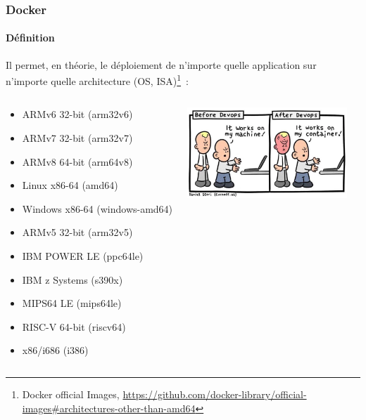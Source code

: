 \documentclass{beamer}
\begin{document}
    \begin{frame}
        \transdissolve
        \frametitle{Docker}
        \framesubtitle{Définition}
        Il permet, en théorie, le déploiement de n'importe quelle application sur n'importe quelle architecture (OS, ISA)\footnote{Docker official Images, \url{https://github.com/docker-library/official-images\#architectures-other-than-amd64}}~:
        \bigbreak
        \begin{columns}
            \begin{scriptsize}
                \begin{itemize}
                    \item ARMv6 32-bit (arm32v6)
                    \item ARMv7 32-bit (arm32v7)
                    \item ARMv8 64-bit (arm64v8)
                    \item Linux x86-64 (amd64)
                    \item Windows x86-64 (windows-amd64)
                    \item ARMv5 32-bit (arm32v5)
                    \item IBM POWER LE (ppc64le)
                    \item IBM z Systems (s390x)
                    \item MIPS64 LE (mips64le)
                    \item RISC-V 64-bit (riscv64)
                    \item x86/i686 (i386)
                \end{itemize}
            \end{scriptsize}
            \centering
            \includegraphics[width=6cm]{image/it-works}
        \end{columns}
    \end{frame}
\end{document}
